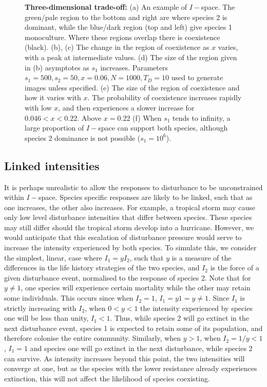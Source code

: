\begin{figure}[htbp]
\begin{tabular}{rrrr}
\end{tabular}
\caption[Consequences of a three-dimensional trade-off]{\textbf{Three-dimensional trade-off:} (a) An example of $I-$space. The green/pale region to the bottom and right are where species 2 is dominant, while the blue/dark region (top and left) give species 1 monoculture. Where these regions overlap there is coexistence (black). (b),  (c) The change in the region of coexistence as $x$ varies, with a peak at intermediate values. (d) The size of the region given in (b) asymptotes as $s_1$ increases. Parameters $s_1=500,s_2=50,x=0.06,N=1000,T_D=10$ used to generate images unless specified. (e) The size of the region of coexistence and how it varies with $x$. The probability of coexistence increases rapidly with low $x$, and then experiences a slower increase for $0.046<x<0.22$. Above $x=0.22$ (f) When $s_1$ tends to infinity, a large proportion of $I-$space can support both species, although species 2 dominance is not possible ($s_1=10^6$).}
\label{full}
\end{figure}

\subsection{Linked intensities}
It is perhaps unrealistic to allow the responses to disturbance to  be unconstrained within $I-$space. Species specific responses are likely to be linked, such that as one increases, the other also increases. For example, a tropical storm may cause only low level disturbance intensities that differ between species. These species may still differ should the tropical storm develop into a hurricane. However, we would anticipate that this escalation of disturbance pressure would serve to increase the intensity experienced by both species. To simulate this, we consider the simplest, linear, case where $I_1=yI_2$, such that $y$ is a measure of the differences in the life history strategies of the two species, and $I_2$ is the force of a given disturbance event, normalised to the response of species 2. Note that for $y\neq 1$, one species will experience certain mortality while the other may retain some individuals. This occurs since when $I_2=1$, $I_1=y1=y\neq1$. Since $I_1$ is strictly increasing with $I_2$, when $0<y<1$ the intensity experienced by species one will be less than unity, $I_1<1$. Thus, while species 2 will go extinct in the next disturbance event, species 1 is expected to retain some of its population, and therefore colonise the entire community. Similarly, when $y>1$, when $I_2=1/y <1$, $I_1=1$ and species one will go extinct in the next disturbance, while species 2 can survive. As intensity increases beyond this point, the two intensities will converge at one, but as the species with the lower resistance already experiences extinction, this will not affect the likelihood of species coexisting.

